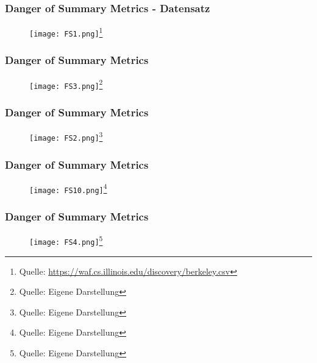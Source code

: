 \documentclass{beamer}
\begin{document}
\begin{frame}
\frametitle{Danger of Summary Metrics - Datensatz}

\begin{figure}
    \centering
    \texttt{[image: FS1.png]}\footnote{Quelle: \url{https://waf.cs.illinois.edu/discovery/berkeley.csv}}
    
\end{figure}

\end{frame}

\begin{frame}
\frametitle{Danger of Summary Metrics}

\begin{figure}
    \centering
    \texttt{[image: FS3.png]}\footnote{Quelle: {Eigene Darstellung}}
    
\end{figure}

\end{frame}

\begin{frame}
\frametitle{Danger of Summary Metrics}

\begin{figure}
    \centering
    \texttt{[image: FS2.png]}\footnote{Quelle: {Eigene Darstellung}}
    
\end{figure}

\end{frame}

\begin{frame}
\frametitle{Danger of Summary Metrics}

\begin{figure}
    \centering
    \texttt{[image: FS10.png]}\footnote{Quelle: {Eigene Darstellung}}
    
\end{figure}

\end{frame}

\begin{frame}
\frametitle{Danger of Summary Metrics}

\begin{figure}
    \centering
    \texttt{[image: FS4.png]}\footnote{Quelle: {Eigene Darstellung}}
    
\end{figure}

\end{frame}
\end{document}
